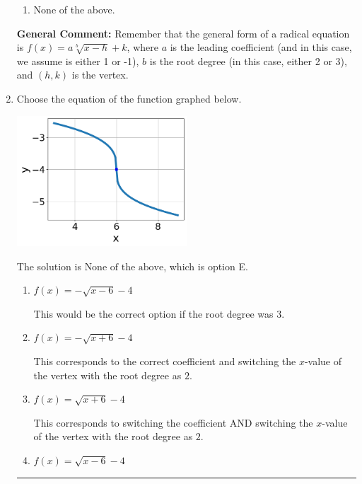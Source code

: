 \documentclass{extbook}[14pt]
\newcommand{\litem}[1]{\item #1

\rule{\textwidth}{0.4pt}}
\begin{document}
\begin{enumerate}
{\begin{enumerate}[label=\Alph*.]
\item None of the above.\end{enumerate}
\textbf{General Comment:} Remember that the general form of a radical equation is $ f(x) = a \sqrt[b]{x - h} + k $, where $a$ is the leading coefficient (and in this case, we assume is either 1 or -1), $b$ is the root degree (in this case, either 2 or 3), and $(h, k)$ is the vertex.
}
\litem{
Choose the equation of the function graphed below.

\begin{center}
    \includegraphics[width=0.5\textwidth]{../Figures/radicalGraphToEquationCopyA.png}
\end{center}


The solution is \( \text{None of the above} \), which is option E.\begin{enumerate}[label=\Alph*.]
\item \( f(x) = - \sqrt{x - 6} - 4 \)

This would be the correct option if the root degree was $3$.
\item \( f(x) = - \sqrt{x + 6} - 4 \)

This corresponds to the correct coefficient and switching the $x$-value of the vertex with the root degree as $2$.
\item \( f(x) = \sqrt{x + 6} - 4 \)

This corresponds to switching the coefficient AND switching the $x$-value of the vertex with the root degree as $2$.
\item \( f(x) = \sqrt{x - 6} - 4 \)


\end{enumerate}}
\end{enumerate}
\end{document}
